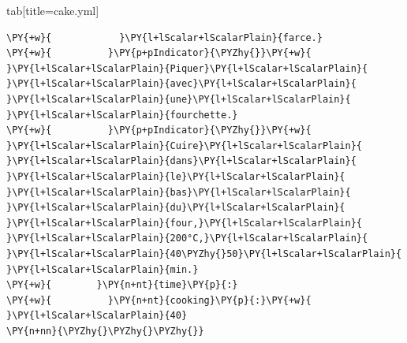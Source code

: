 \documentclass[a4paper,twoside]{article}
\begin{document}
\begin{tsdiv}{tab}[title=cake.yml]
\begin{tscode}[lang=yaml, engine=pygments]
\begin{Verbatim}[commandchars=\\\{\},breaklines, breakanywhere, commandchars=\\\{\}]
\PY{+w}{            }\PY{l+lScalar+lScalarPlain}{farce.}
\PY{+w}{          }\PY{p+pIndicator}{\PYZhy{}}\PY{+w}{ }\PY{l+lScalar+lScalarPlain}{Piquer}\PY{l+lScalar+lScalarPlain}{ }\PY{l+lScalar+lScalarPlain}{avec}\PY{l+lScalar+lScalarPlain}{ }\PY{l+lScalar+lScalarPlain}{une}\PY{l+lScalar+lScalarPlain}{ }\PY{l+lScalar+lScalarPlain}{fourchette.}
\PY{+w}{          }\PY{p+pIndicator}{\PYZhy{}}\PY{+w}{ }\PY{l+lScalar+lScalarPlain}{Cuire}\PY{l+lScalar+lScalarPlain}{ }\PY{l+lScalar+lScalarPlain}{dans}\PY{l+lScalar+lScalarPlain}{ }\PY{l+lScalar+lScalarPlain}{le}\PY{l+lScalar+lScalarPlain}{ }\PY{l+lScalar+lScalarPlain}{bas}\PY{l+lScalar+lScalarPlain}{ }\PY{l+lScalar+lScalarPlain}{du}\PY{l+lScalar+lScalarPlain}{ }\PY{l+lScalar+lScalarPlain}{four,}\PY{l+lScalar+lScalarPlain}{ }\PY{l+lScalar+lScalarPlain}{200°C,}\PY{l+lScalar+lScalarPlain}{ }\PY{l+lScalar+lScalarPlain}{40\PYZhy{}50}\PY{l+lScalar+lScalarPlain}{ }\PY{l+lScalar+lScalarPlain}{min.}
\PY{+w}{        }\PY{n+nt}{time}\PY{p}{:}
\PY{+w}{          }\PY{n+nt}{cooking}\PY{p}{:}\PY{+w}{ }\PY{l+lScalar+lScalarPlain}{40}
\PY{n+nn}{\PYZhy{}\PYZhy{}\PYZhy{}}
\end{Verbatim}
\end{tscode}
\end{tsdiv}
\end{document}
